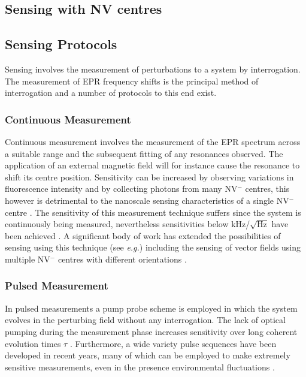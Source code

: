 \documentclass[10pt]{article}
\begin{document}
\begin{multicols}{2}
\section{Sensing with NV centres}

\subsection{Sensing Protocols}
Sensing involves the measurement of perturbations to a system by interrogation. The measurement of EPR frequency shifts is the principal method of interrogation and a number of protocols to this end exist. 

\subsubsection{Continuous Measurement}
Continuous measurement involves the measurement of the EPR spectrum across a suitable range and the subsequent fitting of any resonances observed. The application of an external magnetic field will for instance cause the resonance to shift its centre position. Sensitivity can be increased by observing variations in fluorescence intensity and by collecting photons from many NV$^-$ centres, this however is detrimental to the nanoscale sensing characteristics of a single NV$^-$ centre \cite{schirhagl2014nitrogen}. The sensitivity of this measurement technique suffers since the system is continuously being measured, nevertheless sensitivities below kHz/$\sqrt{\textrm{Hz}}$ have been achieved \cite{acosta2010broadband}. A significant body of work has extended the possibilities of sensing using this technique (see \textit{e.g.}\cite{haberle2013high,schoenfeld2011real}) including the sensing of vector fields using multiple NV$^-$ centres with different orientations \cite{maertz2010vector}.

\subsubsection{Pulsed Measurement}
In pulsed measurements a pump probe scheme is employed in which the system evolves in the perturbing field without any interrogation. The lack of optical pumping during the measurement phase increases sensitivity over long coherent evolution times $\tau$ \cite{maze2008nanoscale}. Furthermore, a wide variety pulse sequences have been developed in recent years, many of which can be employed to make extremely sensitive measurements, even in the presence environmental fluctuations \cite{schirhagl2014nitrogen}.


\end{multicols}
\end{document}

